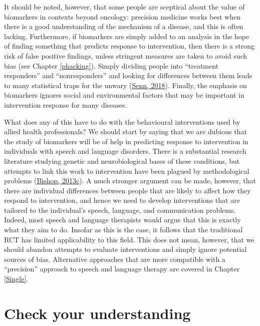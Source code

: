 \documentclass{krantz}
\begin{document}
It should be noted, however, that some people are sceptical about the value of biomarkers in contexts beyond oncology: precision medicine works best when there is a good understanding of the mechanism of a disease, and this is often lacking. Furthermore, if biomarkers are simply added to an analysis in the hope of finding something that predicts response to intervention, then there is a strong risk of false positive findings, unless stringent measures are taken to avoid such bias (see Chapter \ref{phacking}). Simply dividing people into ``treatment responders'' and ``nonresponders'' and looking for differences between them leads to many statistical traps for the unwary (\protect\hyperlink{ref-senn2018}{Senn, 2018}). Finally, the emphasis on biomarkers ignores social and environmental factors that may be important in intervention response for many diseases.

What does any of this have to do with the behavioural interventions used by allied health professionals? We should start by saying that we are dubious that the study of biomarkers will be of help in predicting response to intervention in individuals with speech and language disorders. There is a substantial research literature studying genetic and neurobiological bases of these conditions, but attempts to link this work to intervention have been plagued by methodological problems (\protect\hyperlink{ref-bishop2013c}{Bishop, 2013c}). A much stronger argument can be made, however, that there are individual differences between people that are likely to affect how they respond to intervention, and hence we need to develop interventions that are tailored to the individual's speech, language, and communication problems. Indeed, most speech and language therapists would argue that this is exactly what they aim to do. Insofar as this is the case, it follows that the traditional RCT has limited applicability to this field. This does not mean, however, that we should abandon attempts to evaluate interventions and simply ignore potential sources of bias. Alternative approaches that are more compatible with a ``precision'' approach to speech and language therapy are covered in Chapter \ref{Single}.

\hypertarget{check-your-understanding-14}{%
\section{Check your understanding}\label{check-your-understanding-14}}
\end{document}
